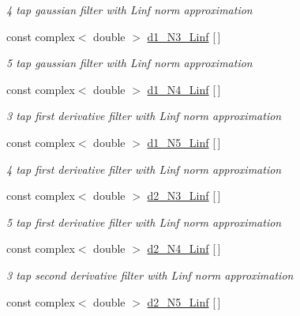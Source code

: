 \begin{DoxyCompactItemize}
\begin{DoxyCompactList}\small\item\em 4 tap gaussian filter with Linf norm approximation \end{DoxyCompactList}\item 
const complex$<$ double $>$ \hyperlink{IIRGausDeriv_8h_ab3d3fead67d13ff1f71ec1671a7f0a75}{d1\+\_\+\+N3\+\_\+\+Linf} \mbox{[}$\,$\mbox{]}\label{IIRGausDeriv_8h_ab3d3fead67d13ff1f71ec1671a7f0a75}

\begin{DoxyCompactList}\small\item\em 5 tap gaussian filter with Linf norm approximation \end{DoxyCompactList}\item 
const complex$<$ double $>$ \hyperlink{IIRGausDeriv_8h_a42c5979a0cc3ff593c910114a7a04b54}{d1\+\_\+\+N4\+\_\+\+Linf} \mbox{[}$\,$\mbox{]}\label{IIRGausDeriv_8h_a42c5979a0cc3ff593c910114a7a04b54}

\begin{DoxyCompactList}\small\item\em 3 tap first derivative filter with Linf norm approximation \end{DoxyCompactList}\item 
const complex$<$ double $>$ \hyperlink{IIRGausDeriv_8h_a941413cacffcd396c95b80945cf2ef7b}{d1\+\_\+\+N5\+\_\+\+Linf} \mbox{[}$\,$\mbox{]}\label{IIRGausDeriv_8h_a941413cacffcd396c95b80945cf2ef7b}

\begin{DoxyCompactList}\small\item\em 4 tap first derivative filter with Linf norm approximation \end{DoxyCompactList}\item 
const complex$<$ double $>$ \hyperlink{IIRGausDeriv_8h_a4d0b8b8666422f4f29a55924643844b2}{d2\+\_\+\+N3\+\_\+\+Linf} \mbox{[}$\,$\mbox{]}\label{IIRGausDeriv_8h_a4d0b8b8666422f4f29a55924643844b2}

\begin{DoxyCompactList}\small\item\em 5 tap first derivative filter with Linf norm approximation \end{DoxyCompactList}\item 
const complex$<$ double $>$ \hyperlink{IIRGausDeriv_8h_aa44e4e7714c800b8ba69135d67e969c1}{d2\+\_\+\+N4\+\_\+\+Linf} \mbox{[}$\,$\mbox{]}\label{IIRGausDeriv_8h_aa44e4e7714c800b8ba69135d67e969c1}

\begin{DoxyCompactList}\small\item\em 3 tap second derivative filter with Linf norm approximation \end{DoxyCompactList}\item 
const complex$<$ double $>$ \hyperlink{IIRGausDeriv_8h_a99038e1ed42f8611a68f763b70f7f2f7}{d2\+\_\+\+N5\+\_\+\+Linf} \mbox{[}$\,$\mbox{]}\label{IIRGausDeriv_8h_a99038e1ed42f8611a68f763b70f7f2f7}


\end{DoxyCompactItemize}
